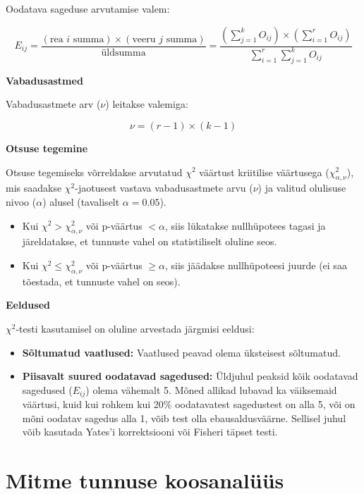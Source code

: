 \documentclass[
]{book}
\providecommand{\tightlist}{%
  \setlength{\itemsep}{0pt}\setlength{\parskip}{0pt}}
\begin{document}
Oodatava sageduse arvutamise valem:

\[
E_{ij} = \frac{(\text{rea } i \text{ summa}) \times (\text{veeru } j \text{ summa})}{\text{üldsumma}} = \frac{(\sum_{j=1}^{k} O_{ij}) \times (\sum_{i=1}^{r} O_{ij})}{\sum_{i=1}^{r} \sum_{j=1}^{k} O_{ij}}
\]

\textbf{Vabadusastmed}

Vabadusastmete arv (\(\nu\)) leitakse valemiga:

\[\nu = (r - 1) \times (k - 1)\]

\textbf{Otsuse tegemine}

Otsuse tegemiseks võrreldakse arvutatud \(\chi^2\) väärtust kriitilise väärtusega (\(\chi^2_{\alpha, \nu}\)), mis saadakse \(\chi^2\)-jaotusest vastava vabadusastmete arvu (\(\nu\)) ja valitud olulisuse nivoo (\(\alpha\)) alusel (tavaliselt \(\alpha = 0.05\)).

\begin{itemize}
\tightlist
\item
  Kui \(\chi^2 > \chi^2_{\alpha, \nu}\) või p-väärtus \(< \alpha\), siis lükatakse nullhüpotees tagasi ja järeldatakse, et tunnuste vahel on statistiliselt oluline seos.
\item
  Kui \(\chi^2 \leq \chi^2_{\alpha, \nu}\) või p-väärtus \(\geq \alpha\), siis jäädakse nullhüpoteesi juurde (ei saa tõestada, et tunnuste vahel on seos).
\end{itemize}

\textbf{Eeldused}

\(\chi^2\)-testi kasutamisel on oluline arvestada järgmisi eeldusi:

\begin{itemize}
\tightlist
\item
  \textbf{Sõltumatud vaatlused:} Vaatlused peavad olema üksteisest sõltumatud.
\item
  \textbf{Piisavalt suured oodatavad sagedused:} Üldjuhul peaksid kõik oodatavad sagedused (\(E_{ij}\)) olema vähemalt 5. Mõned allikad lubavad ka väiksemaid väärtusi, kuid kui rohkem kui 20\% oodatavatest sagedustest on alla 5, või on mõni oodatav sagedus alla 1, võib test olla ebausaldusväärne. Sellisel juhul võib kasutada Yates'i korrektsiooni või Fisheri täpset testi.
\end{itemize}

\chapter{Mitme tunnuse koosanalüüs}\label{mitme-tunnuse-koosanaluxfcuxfcs}
\end{document}
